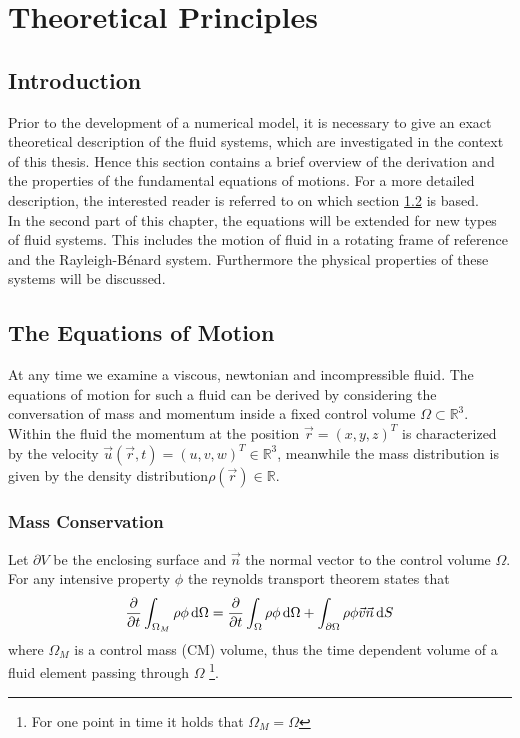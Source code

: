 \chapter{Theoretical Principles}

\section{Introduction}

Prior to the development of a numerical model, it is necessary to give an exact theoretical description of the
fluid systems, which are investigated in the context of this thesis.
Hence this section contains a brief overview of the derivation and the properties of the fundamental equations of motions.
For a more detailed description, the interested reader is referred to \citep{ferziger99} on which section \ref{theorie:eqm1} is based.\\
In the second part of this chapter, the equations will be extended for new types of fluid systems.
This includes the motion of fluid in a rotating frame of reference and the Rayleigh-B\'{e}nard system.
Furthermore the physical properties of these systems will be discussed.

\section{The Equations of Motion}\label{theorie:eqm1}

At any time we examine a viscous, newtonian and incompressible fluid. The equations of motion for such a fluid can be derived by considering the conversation of
mass and momentum inside a fixed control volume $\Omega \subset \mathbb{R}^3$.
Within the fluid the momentum at the position $\vec{r} = (x, y, z)^T$  is  characterized by the velocity $\vec{u}(\vec{r}, t) = (u, v, w)^T \in \mathbb{R}^3$,
meanwhile the mass distribution is given by the density distribution$\rho(\vec{r}) \in \mathbb{R}$.

\subsection{Mass Conservation}

Let $\partial V$ be the enclosing surface and $\vec{n}$ the normal vector to the control volume $\Omega$.
For any intensive property $\phi$ the reynolds transport theorem states that
\begin{align}
    \pdn[]{t} \int_{\Omega_M} \rho \phi \dif \Omega = \pdn[]{t}\int_{\Omega} \rho \phi \dif \Omega + \int_{\partial\Omega} \rho \phi \vec{v} \vec{n} \dif S
\end{align}
where $\Omega_M$ is a control mass (CM) volume, thus the time dependent volume of a fluid element passing through $\Omega$
\footnote{For one point in time it holds that $\Omega_M = \Omega$}.

